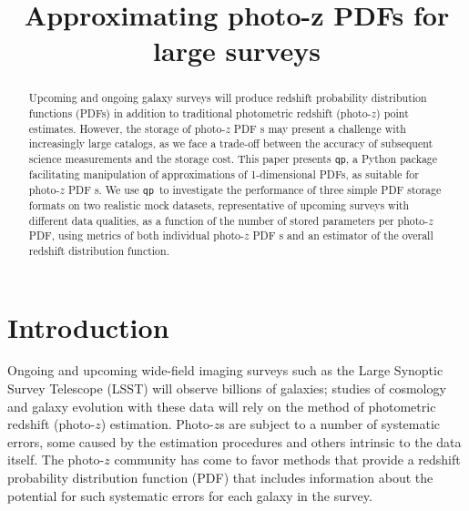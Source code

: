\documentclass[\docopts]{\docclass}
\newcommand{\qp}{\texttt{qp}\xspace}
\newcommand{\pz}{photo-$z$ PDF\xspace}
\begin{document}
\title{ Approximating photo-z PDFs for large surveys }


\begin{abstract}

Upcoming and ongoing galaxy surveys will produce redshift probability 
distribution functions (PDFs) in addition to traditional photometric redshift 
(photo-$z$) point estimates.
However, the storage of \pz s may present a challenge with increasingly large 
catalogs, as we face a trade-off between the accuracy of subsequent science 
measurements and the storage cost.
This paper presents \qp, a Python package facilitating manipulation of 
approximations of 1-dimensional PDFs, as suitable for \pz s.
We use \qp\ to investigate the performance of three simple PDF storage formats 
on two realistic mock datasets, representative of upcoming surveys with 
different data qualities, as a function of the number of stored parameters per 
\pz, using metrics of both individual \pz s and an estimator of the overall 
redshift distribution function.

\end{abstract}


\maketitlepost





\section{Introduction}
\label{sec:intro}


Ongoing and upcoming wide-field imaging surveys such as the Large Synoptic 
Survey Telescope (LSST) will observe billions of galaxies; studies of cosmology 
and galaxy evolution with these data will rely on the method of photometric 
redshift (photo-$z$) estimation.
Photo-$z$s are subject to a number of systematic errors, some caused by the 
estimation procedures and others intrinsic to the data itself.
The photo-$z$ community has come to favor methods that provide a redshift 
probability distribution function (PDF) that includes information about the 
potential for such systematic errors for each galaxy in the survey.
\end{document}
